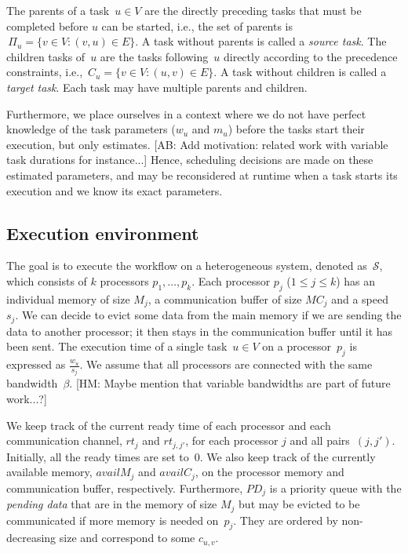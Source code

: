 \documentclass[conference]{IEEEtran}
\newcommand{\parents}[1]{\,\Pi_{#1}}
\newcommand{\children}[1]{\,C_{#1}}
\newcommand{\cluster}{\,\mathcal{S}}
\newcommand{\MM}{M}
\newcommand{\rt}{rt}
\newcommand{\PD}{PD}
\newcommand{\hmey}[1]{{\color{red}[HM: #1]}}
\newcommand{\AB}[1]{{\color{purple}[AB: #1]}}
\begin{document}
    The parents of a task~$u\in V$ are the directly preceding tasks that must be completed before $u$ can be started, i.e., the set of parents is
    $ \parents{u} = \{v \in V: (v,u) \in E\}$. A task without parents is called a {\it source task}.
    The children tasks of~$u$ are the tasks following~$u$ directly according to the precedence constraints, i.e.,
    $ \children{u} = \{v \in V: (u,v) \in E\}$. A task without children is called a {\it target task}.
    Each task may have multiple parents and children.


Furthermore, we place ourselves in a context where we do not have perfect knowledge
of the task parameters ($w_u$ and $m_u$) before the tasks start their execution,
but only estimates. \AB{Add motivation: related work with variable task durations for instance...}
Hence, scheduling decisions are made on these estimated parameters, and
may be reconsidered at runtime when a task starts its execution and we know
its exact parameters.


    \subsection{Execution environment}
    \label{sec.mod.plat}

    The goal is to execute the workflow on a heterogeneous system, denoted as $\cluster$, which
    consists of $k$ processors $p_1, \dots, p_k$.
    Each processor $p_j$ ($1 \leq j \leq k$) has an individual memory of size $M_j$, a communication
    buffer of size $MC_j$ and a speed~$s_j$.
    We can decide to evict some data from the main memory if we are sending the data
    to another processor; it then stays in the communication buffer until it has been sent.
    The execution time of a single task~$u\in V$ on a processor~$p_j$ is expressed as $\frac{w_u}{s_j}$.
    We assume that all processors are connected with the same bandwidth~$\beta$.
    \hmey{Maybe mention that variable bandwidths are part of future work...?}

    We keep track of the current ready time of each processor and each communication
    channel, $\rt_j$ and $\rt_{j,j'}$, for each processor $j$ and all pairs~$(j,j')$.
    Initially, all the ready times are set to~$0$.
    We also keep track of the currently available memory, $availM_j$ and $availC_j$,
    on the processor memory and communication buffer, respectively.
    Furthermore, $\PD_j$ is a priority queue with the {\em pending data}
    that are in the memory of size $\MM_j$ but may be evicted to be communicated if
    more memory is needed on~$p_j$. They are ordered by non-decreasing size and
    correspond to some $c_{u,v}$.
\end{document}
